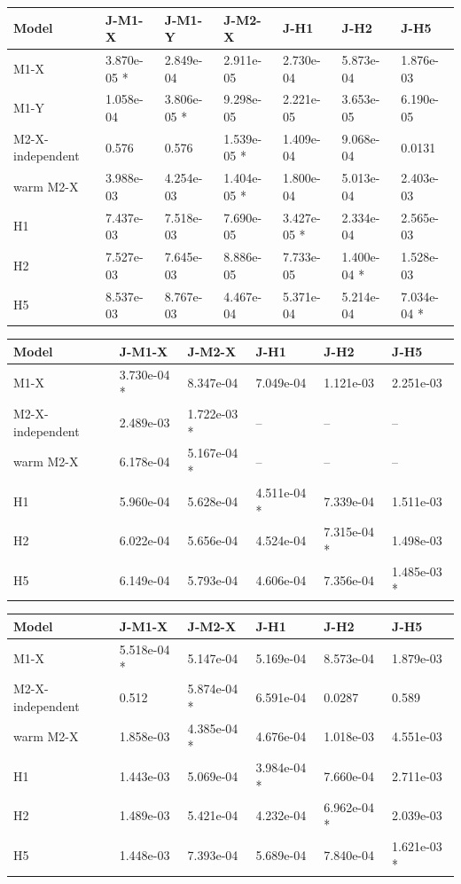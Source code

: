 \begin{tabular}{lllllll}
\toprule
Model & J-M1-X & J-M1-Y & J-M2-X & J-H1 & J-H2 & J-H5 \\
\midrule
M1-X & 3.870e-05 * & 2.849e-04 & 2.911e-05 & 2.730e-04 & 5.873e-04 & 1.876e-03 \\
M1-Y & 1.058e-04 & 3.806e-05 * & 9.298e-05 & 2.221e-05 & 3.653e-05 & 6.190e-05 \\
M2-X-independent & 0.576 & 0.576 & 1.539e-05 * & 1.409e-04 & 9.068e-04 & 0.0131 \\
warm M2-X & 3.988e-03 & 4.254e-03 & 1.404e-05 * & 1.800e-04 & 5.013e-04 & 2.403e-03 \\
H1 & 7.437e-03 & 7.518e-03 & 7.690e-05 & 3.427e-05 * & 2.334e-04 & 2.565e-03 \\
H2 & 7.527e-03 & 7.645e-03 & 8.886e-05 & 7.733e-05 & 1.400e-04 * & 1.528e-03 \\
H5 & 8.537e-03 & 8.767e-03 & 4.467e-04 & 5.371e-04 & 5.214e-04 & 7.034e-04 * \\
\bottomrule
\end{tabular}

\begin{tabular}{llllll}
\toprule
Model & J-M1-X & J-M2-X & J-H1 & J-H2 & J-H5 \\
\midrule
M1-X & 3.730e-04 * & 8.347e-04 & 7.049e-04 & 1.121e-03 & 2.251e-03 \\
M2-X-independent & 2.489e-03 & 1.722e-03 * & -- & -- & -- \\
warm M2-X & 6.178e-04 & 5.167e-04 * & -- & -- & -- \\
H1 & 5.960e-04 & 5.628e-04 & 4.511e-04 * & 7.339e-04 & 1.511e-03 \\
H2 & 6.022e-04 & 5.656e-04 & 4.524e-04 & 7.315e-04 * & 1.498e-03 \\
H5 & 6.149e-04 & 5.793e-04 & 4.606e-04 & 7.356e-04 & 1.485e-03 * \\
\bottomrule
\end{tabular}

\begin{tabular}{llllll}
\toprule
Model & J-M1-X & J-M2-X & J-H1 & J-H2 & J-H5 \\
\midrule
M1-X & 5.518e-04 * & 5.147e-04 & 5.169e-04 & 8.573e-04 & 1.879e-03 \\
M2-X-independent & 0.512 & 5.874e-04 * & 6.591e-04 & 0.0287 & 0.589 \\
warm M2-X & 1.858e-03 & 4.385e-04 * & 4.676e-04 & 1.018e-03 & 4.551e-03 \\
H1 & 1.443e-03 & 5.069e-04 & 3.984e-04 * & 7.660e-04 & 2.711e-03 \\
H2 & 1.489e-03 & 5.421e-04 & 4.232e-04 & 6.962e-04 * & 2.039e-03 \\
H5 & 1.448e-03 & 7.393e-04 & 5.689e-04 & 7.840e-04 & 1.621e-03 * \\
\bottomrule
\end{tabular}
